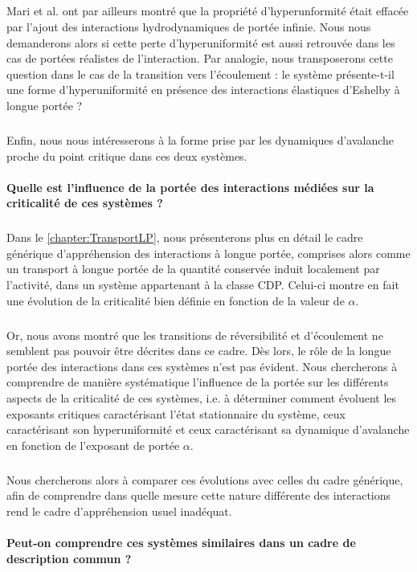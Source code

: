 \subparagraph{}Mari et al. ont par ailleurs montré que la propriété d'hyperunformité était effacée par l'ajout des interactions hydrodynamiques de portée infinie. Nous nous demanderons alors si cette perte d'hyperuniformité est aussi retrouvée dans les cas de portées réalistes de l'interaction. Par analogie, nous transposerons cette question dans le cas de la transition vers l'écoulement : le système présente-t-il une forme d'hyperuniformité en présence des interactions élastiques d'Eshelby à longue portée ?

\subparagraph{}Enfin, nous nous intéresserons à la forme prise par les dynamiques d'avalanche proche du point critique dans ces deux systèmes.

\paragraph{Quelle est l'influence de la portée des interactions médiées sur la criticalité de ces systèmes ?}

\subparagraph{}Dans le \autoref{chapter:TransportLP}, nous présenterons plus en détail le cadre générique d'appréhension des interactions à longue portée, comprises alors comme un transport à longue portée de la quantité conservée induit localement par l'activité, dans un système appartenant à la classe CDP. Celui-ci montre en fait une évolution de la criticalité bien définie en fonction de la valeur de $\alpha$.

\subparagraph{}Or, nous avons montré que les transitions de réversibilité et d'écoulement ne semblent pas pouvoir être décrites dans ce cadre. Dès lors, le rôle de la longue portée des interactions dans ces systèmes n'est pas évident. Nous chercherons à comprendre de manière systématique l'influence de la portée sur les différents aspects de la criticalité de ces systèmes, i.e. à déterminer comment évoluent les exposants critiques caractérisant l'état stationnaire du système, ceux caractérisant son hyperuniformité et ceux caractérisant sa dynamique d'avalanche en fonction de l'exposant de portée $\alpha$.

\subparagraph{}Nous chercherons alors à comparer ces évolutions avec celles du cadre générique, afin de comprendre dans quelle mesure cette nature différente des interactions rend le cadre d'appréhension usuel inadéquat.

\paragraph{Peut-on comprendre ces systèmes similaires dans un cadre de description commun ?}

